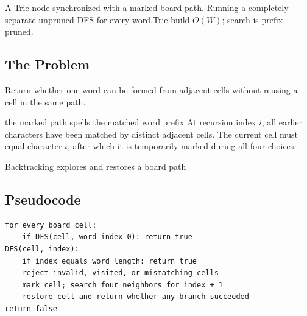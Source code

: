   {A Trie node synchronized with a marked board path.}
  {Running a completely separate unpruned DFS for every word.}{Trie build $O(W)$; search is prefix-pruned.}



\subsection{The Problem}
Return whether one word can be formed from adjacent cells without reusing a
cell in the same path.

\begin{invariantbox}{the marked path spells the matched word prefix}
At recursion index \(i\), all earlier characters have been matched by distinct
adjacent cells. The current cell must equal character \(i\), after which it is
temporarily marked during all four choices.
\end{invariantbox}

\begin{visualbox}{Backtracking explores and restores a board path}
\centering
{}
\end{visualbox}

\subsection{Pseudocode}
\begin{lstlisting}[style=pseudocode]
for every board cell:
    if DFS(cell, word index 0): return true
DFS(cell, index):
    if index equals word length: return true
    reject invalid, visited, or mismatching cells
    mark cell; search four neighbors for index + 1
    restore cell and return whether any branch succeeded
return false
\end{lstlisting}


